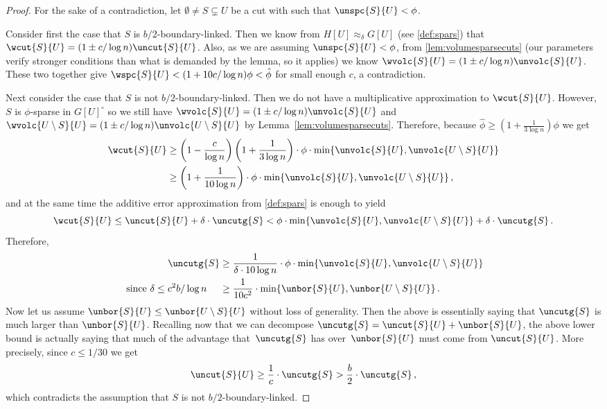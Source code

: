 \begin{proof}
	For the sake of a contradiction, let $\emptyset \neq S \subsetneq U$ be a cut with  such that $\unspc{S}{U} < \phi$.
	
	Consider first the case that $S$ is $b/2$-boundary-linked. Then we know from $H[U] \approx_\delta G[U]$ (see \cref{def:spars}) that $\wcut{S}{U} = (1 \pm c/\log n) \uncut{S}{U}$. Also, as we are assuming $\unspc{S}{U} < \phi$, from \cref{lem:volumesparsecuts} (our parameters verify stronger conditions than what is demanded by the lemma, so it applies) we know $\wvolc{S}{U}= (1 \pm c/\log n)\unvolc{S}{U}$. These two together give $\wspc{S}{U} < (1+10c/\log n)\phi < \hat{\phi}$ for small enough $c$, a contradiction.
	
	Next consider the case that $S$ is not $b/2$-boundary-linked. Then we do not have a multiplicative approximation to $\wcut{S}{U}$. However, $S$ is $\phi$-sparse in $G[U]^\circ$ so we still have $\wvolc{S}{U}= (1 \pm c/\log n)\unvolc{S}{U}$ and $\wvolc{U \setminus S}{U}= (1 \pm c/\log n)\unvolc{U \setminus S}{U}$ by Lemma~\ref{lem:volumesparsecuts}. Therefore, because $\hat{\phi} \ge (1+\frac{1}{3\log n}) \phi$ we get
	\begin{align*}
		\wcut{S}{U} & \ge \left(1-\frac{c}{\log n}\right) \left(1+\frac{1}{3\log n}\right)\cdot \phi \cdot \min\{\unvolc{S}{U}, \unvolc{U \setminus S}{U}\} \\
		& \ge \left(1+\frac{1}{10\log n}\right)\cdot \phi \cdot \min\{\unvolc{S}{U}, \unvolc{U \setminus S}{U}\} \, ,
	\end{align*}
	and at the same time the additive error approximation from \cref{def:spars} is enough to yield
	\begin{equation*}
		\wcut{S}{U} \le \uncut{S}{U} + \delta \cdot \uncutg{S} < \phi \cdot \min\{\unvolc{S}{U}, \unvolc{U \setminus S}{U}\}  + \delta\cdot \uncutg{S} \, .
	\end{equation*}
	Therefore,
	\begin{align*}
		\uncutg{S} & \ge \frac{1}{\delta \cdot10 \log n} \cdot \phi \cdot \min\{\unvolc{S}{U}, \unvolc{U \setminus S}{U}\} \\
		\text{ since $\delta \le c^2 b/ \log n$ } \quad & \ge \frac{1}{10c^2} \cdot \min \{\unbor{S}{U}, \unbor{U \setminus S}{U}\}\, .
	\end{align*}
	Now let us assume $\unbor{S}{U} \le \unbor{U \setminus S}{U}$ without loss of generality. Then the above is essentially saying that $\uncutg{S}$ is much larger than $\unbor{S}{U}$.	Recalling now that we can decompose $\uncutg{S}=\uncut{S}{U}+\unbor{S}{U}$, the above lower bound is actually saying that much of the advantage that~$\uncutg{S}$ has over~$\unbor{S}{U}$ must come from $\uncut{S}{U}$. More precisely, since $c \le 1/30$ we get
	\begin{equation*}
		\uncut{S}{U} \ge\frac{1}{c} \cdot \uncutg{S} > \frac{b}{2} \cdot \uncutg{S} \, ,
	\end{equation*}
	which contradicts the assumption that $S$ is not $b/2$-boundary-linked.
\end{proof}
